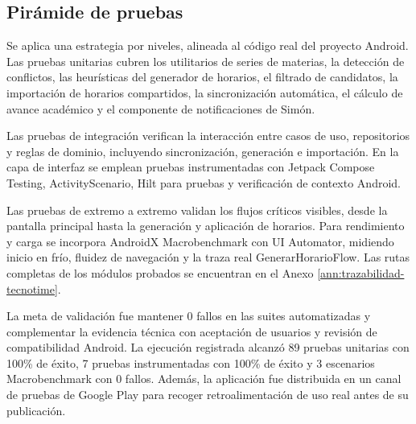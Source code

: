 \subsection{Pirámide de pruebas}
Se aplica una estrategia por niveles, alineada al código real del proyecto Android. Las pruebas unitarias cubren los utilitarios de series de materias, la detección de conflictos, las heurísticas del generador de horarios, el filtrado de candidatos, la importación de horarios compartidos, la sincronización automática, el cálculo de avance académico y el componente de notificaciones de Simón.

Las pruebas de integración verifican la interacción entre casos de uso, repositorios y reglas de dominio, incluyendo sincronización, generación e importación. En la capa de interfaz se emplean pruebas instrumentadas con Jetpack Compose Testing, ActivityScenario, Hilt para pruebas y verificación de contexto Android.

Las pruebas de extremo a extremo validan los flujos críticos visibles, desde la pantalla principal hasta la generación y aplicación de horarios. Para rendimiento y carga se incorpora AndroidX Macrobenchmark con UI Automator, midiendo inicio en frío, fluidez de navegación y la traza real GenerarHorarioFlow. Las rutas completas de los módulos probados se encuentran en el Anexo \ref{ann:trazabilidad-tecnotime}.

La meta de validación fue mantener 0 fallos en las suites automatizadas y complementar la evidencia técnica con aceptación de usuarios y revisión de compatibilidad Android. La ejecución registrada alcanzó 89 pruebas unitarias con 100\% de éxito, 7 pruebas instrumentadas con 100\% de éxito y 3 escenarios Macrobenchmark con 0 fallos. Además, la aplicación fue distribuida en un canal de pruebas de Google Play para recoger retroalimentación de uso real antes de su publicación.
